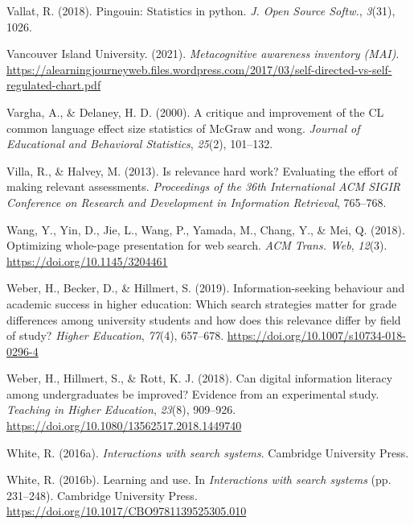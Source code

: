 \documentclass[letterpaper, nobind]{templates/ociamthesis}
\newlength{\cslhangindent}
\newenvironment{CSLReferences}[2] %
 {%
  \setlength{\parindent}{0pt}
  \ifodd #1
  \let\oldpar\par
  \def\par{\hangindent=\cslhangindent\oldpar}
  \fi
  \setlength{\parskip}{1mm}
  \setlength{\baselineskip}{6mm}
 }%
 {}
\begin{document}
\begin{CSLReferences}{1}{0}
\leavevmode{}%
Vallat, R. (2018). Pingouin: Statistics in python. \emph{J. Open Source Softw.}, \emph{3}(31), 1026.

\leavevmode{}%
Vancouver Island University. (2021). \emph{Metacognitive awareness inventory (MAI)}. \url{https://alearningjourneyweb.files.wordpress.com/2017/03/self-directed-vs-self-regulated-chart.pdf}

\leavevmode{}%
Vargha, A., \& Delaney, H. D. (2000). A critique and improvement of the CL common language effect size statistics of McGraw and wong. \emph{Journal of Educational and Behavioral Statistics}, \emph{25}(2), 101--132.

\leavevmode{}%
Villa, R., \& Halvey, M. (2013). Is relevance hard work? Evaluating the effort of making relevant assessments. \emph{Proceedings of the 36th International ACM SIGIR Conference on Research and Development in Information Retrieval}, 765--768.

\leavevmode{}%
Wang, Y., Yin, D., Jie, L., Wang, P., Yamada, M., Chang, Y., \& Mei, Q. (2018). Optimizing whole-page presentation for web search. \emph{ACM Trans. Web}, \emph{12}(3). \url{https://doi.org/10.1145/3204461}

\leavevmode{}%
Weber, H., Becker, D., \& Hillmert, S. (2019). Information-seeking behaviour and academic success in higher education: Which search strategies matter for grade differences among university students and how does this relevance differ by field of study? \emph{Higher Education}, \emph{77}(4), 657--678. \url{https://doi.org/10.1007/s10734-018-0296-4}

\leavevmode{}%
Weber, H., Hillmert, S., \& Rott, K. J. (2018). Can digital information literacy among undergraduates be improved? Evidence from an experimental study. \emph{Teaching in Higher Education}, \emph{23}(8), 909--926. \url{https://doi.org/10.1080/13562517.2018.1449740}

\leavevmode{}%
White, R. (2016a). \emph{Interactions with search systems}. Cambridge University Press.

\leavevmode{}%
White, R. (2016b). Learning and use. In \emph{Interactions with search systems} (pp. 231--248). {Cambridge University Press}. \url{https://doi.org/10.1017/CBO9781139525305.010}


\end{CSLReferences}
\end{document}
